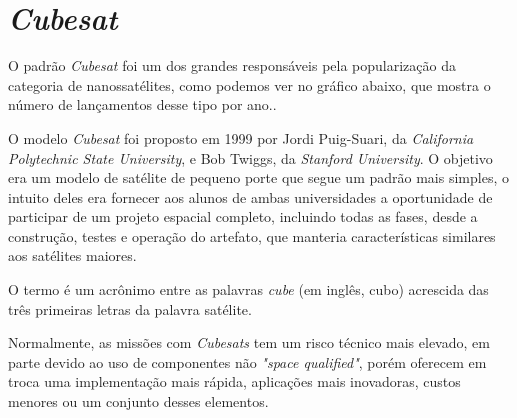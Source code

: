 \section{\textit{Cubesat}}\label{cubesat_revision}

O padrão \textit{Cubesat} foi um dos grandes responsáveis pela popularização da categoria de nanossatélites, como podemos ver no gráfico abaixo, que mostra o número de lançamentos desse tipo por ano.\cite{cubesats_cgee}.

\noindent
\begin{minipage}{\linewidth}
\label{cubesat_launches_fig}
\end{minipage}

O modelo \textit{Cubesat} foi proposto em 1999 por Jordi Puig-Suari, da \textit{California Polytechnic State University}, e Bob Twiggs, da \textit{Stanford University}. O objetivo era um modelo de satélite de pequeno porte que segue um padrão mais simples, o intuito deles era fornecer aos alunos de ambas universidades a oportunidade de  participar de um projeto espacial completo, incluindo todas as fases, desde a construção, testes e operação do artefato, que manteria características similares aos satélites maiores. 

O termo é um acrônimo entre as palavras \textit{cube} (em inglês, cubo) acrescida das três primeiras letras da palavra satélite.

Normalmente, as missões com \textit{Cubesats} tem um risco técnico mais elevado, em parte devido ao uso de componentes não \textit{"space qualified"}, porém oferecem em troca uma implementação mais rápida, aplicações mais inovadoras, custos menores ou um conjunto desses elementos.

